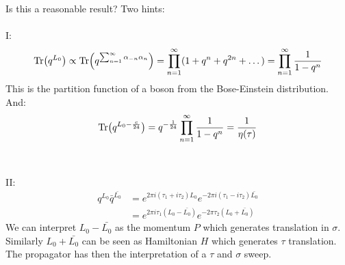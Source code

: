\documentclass[11pt,aspectratio=169]{beamer}
\begin{document}
\begin{frame}
	Is this a reasonable result? Two hints:
	\\~\\
	I:
	\begin{equation}
		\Tr(q^{L_0}) \propto \Tr(q^{\sum_{n=1}^{\infty}\alpha_{-n}\alpha_n}) = \prod_{n=1}^{\infty}(1 + q^n + q^{2n} + \dots) = \prod_{n=1}^{\infty}\frac{1}{1-q^n}	
	\end{equation}
	This is the partition function of a boson from the Bose-Einstein distribution.
	\\
	And:
	\begin{equation}
		\Tr(q^{L_0 - \frac{c}{24}}) = q^{-\frac{1}{24}} \prod_{n=1}^{\infty}\frac{1}{1-q^n}	= \frac{1}{\eta(\tau)}
	\end{equation}
	\\~\\
	II:
	\begin{align*}
		q^{L_0}\bar{q}^{\bar{L_0}} &= e^{2\pi i (\tau_1 + i \tau_2)L_0}e^{-2\pi i (\tau_1 - i \tau_2)\bar{L_0}}\\
		&= e^{2 \pi i \tau_1 (L_0 - \bar{L_0})}e^{-2\pi \tau_2 (L_0 + \bar{L_0})}
	\end{align*}
	We can interpret $L_0 - \bar{L_0}$ as the momentum $P$ which generates translation in $\sigma$. Similarly $L_0 + \bar{L_0}$ can be seen as Hamiltonian $H$ which generates $\tau$ translation.
	\\
	The propagator has then the interpretation of a $\tau$ and $\sigma$ sweep.

\end{frame}

\end{document}
